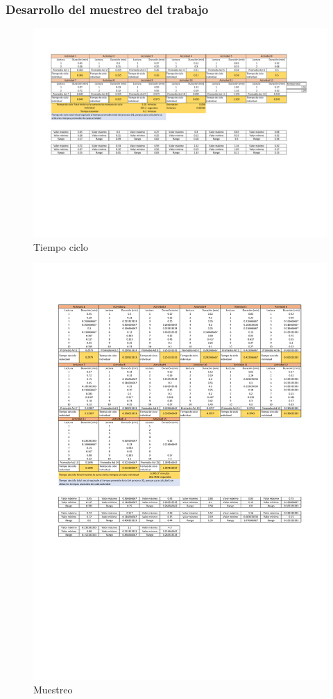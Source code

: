 \subsubsection{Desarrollo del muestreo del trabajo}
% 
\begin{figure}[H]
    \centering
    \includegraphics[scale=0.25]{13/img/tiempoCicloEnsamble.pdf}
    \caption{Tiempo ciclo}
    \label{fig:Tiempo ciclo}
\end{figure}
\begin{figure}[H]
    \centering
    \includegraphics[scale=0.25]{13/img/tiempoCicloEnsambleDos.pdf}
    \caption{Muestreo}
    \label{fig:Muestreo}
\end{figure}
% 
